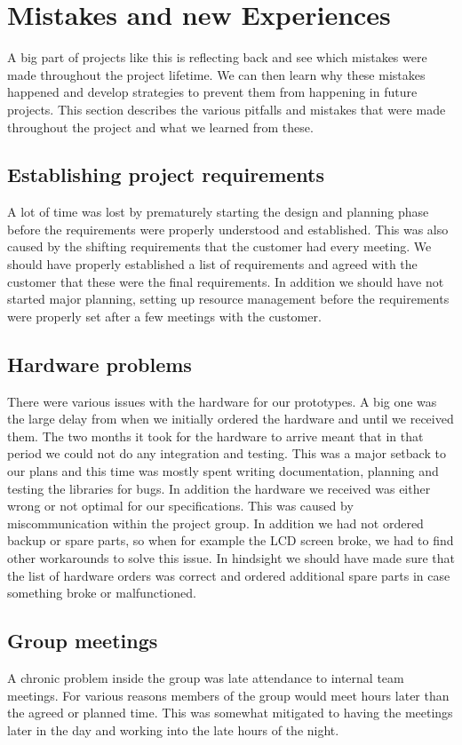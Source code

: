 \section{Mistakes and new Experiences}
A big part of projects like this is reflecting back and see which mistakes were made throughout
the project lifetime. We can then learn why these mistakes happened and develop strategies to
prevent them from happening in future projects. This section describes the various pitfalls and
mistakes that were made throughout the project and what we learned from these.

\subsection{Establishing project requirements}
A lot of time was lost by prematurely starting the design and planning phase before the
requirements were properly understood and established. This was also caused by the shifting 
requirements that the customer had every meeting. We should have properly established a list of
requirements and agreed with the customer that these were the final requirements. In addition we
should have not started major planning, setting up resource management before the requirements
were properly set after a few meetings with the customer.

\subsection{Hardware problems}
There were various issues with the hardware for our prototypes. A big one was the large delay
from when we initially ordered the hardware and until we received them. The two months it took
for the hardware to arrive meant that in that period we could not do any integration and testing.
This was a major setback to our plans and this time was mostly spent writing documentation, planning
and testing the libraries for bugs. In addition the hardware we received was either wrong or not
optimal for our specifications. This was caused by miscommunication within the project group. In
addition we had not ordered backup or spare parts, so when for example the LCD screen broke,
we had to find other workarounds to solve this issue. In hindsight we should have made sure that
the list of hardware orders was correct and ordered additional spare parts in case something broke
or malfunctioned.

\subsection{Group meetings}
A chronic problem inside the group was late attendance to internal team meetings. For various reasons members of
the group would meet hours later than the agreed or planned time. This was somewhat mitigated to having 
the meetings later in the day and working into the late hours of the night.

